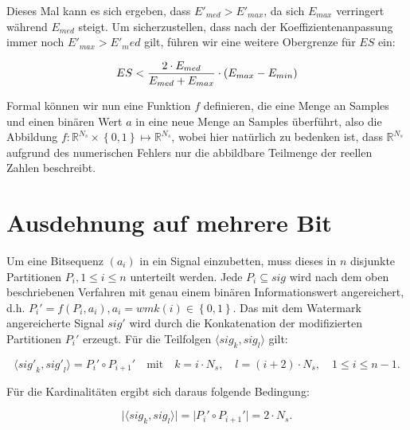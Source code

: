 Dieses Mal kann es sich ergeben, dass ${E'}_{med} > {E'}_{max}$, da sich ${E}_{max}$ verringert während ${E}_{med}$ steigt. Um sicherzustellen, dass nach der Koeffizientenanpassung immer noch ${E'}_{max} > {E'}_med$ gilt, führen wir eine weitere Obergrenze für $ES$ ein:

	\begin{equation}
		ES < { 2 \cdot {E}_{med} \over {E}_{med} + {E}_{max} } \cdot ( {E}_{max} - {E}_{min} )
		\label{equ:embeddingstrengthconstraint_case2}
	\end{equation}

Formal können wir nun eine Funktion $f$ definieren, die eine Menge an Samples und einen binären Wert $a$ in eine neue Menge an Samples überführt, also die Abbildung $f: {\mathbb{R}}^{{N}_{s}} \times \left\{0,1\right\} \mapsto  {\mathbb{R}}^{{N}_{s}}$, wobei hier natürlich zu bedenken ist, dass ${\mathbb{R}}^{{N}_{s}}$ aufgrund des numerischen Fehlers nur die abbildbare Teilmenge der reellen Zahlen beschreibt. 

\section{Ausdehnung auf mehrere Bit}
\label{sec:embeddingstragety_bitsequence}

Um eine Bitsequenz $({a}_{i})$ in ein Signal einzubetten, muss dieses in $n$ disjunkte Partitionen ${P}_{i}, {1}\leq{i}\leq{n}$ unterteilt werden. Jede ${P}_{i}\subseteq{sig}$ wird nach dem oben beschriebenen Verfahren mit genau einem binären Informationswert angereichert, d.h. ${P}_{i}'=f({P}_{i}, {a}_{i}), {a}_{i} = wmk(i)\in\left\{0,1\right\}$. Das mit dem Watermark angereicherte Signal $sig'$ wird durch die Konkatenation der modifizierten Partitionen ${P}_{i}'$ erzeugt. Für die Teilfolgen $\langle{sig}_{k},{sig}_{l}\rangle$ gilt:

	\begin{equation}
		\langle{sig'}_{k},{sig'}_{l}\rangle = {P}_{i}'\circ{P}_{i+1}' \quad\mbox{mit}\quad k=i \cdot {N}_{s},\quad l=(i+2) \cdot {N}_{s},\quad {1}\leq{i}\leq{n-1}.
		\label{equ:signalconcat}
	\end{equation}

Für die Kardinalitäten ergibt sich daraus folgende Bedingung:

	\begin{equation}
 	   \vert\langle{sig}_{k},{sig}_{l}\rangle\vert = \vert{P}_{i}'\circ{P}_{i+1}'\vert = 2 \cdot {N}_{s}.
	   \label{equ:signalcardinality}
	\end{equation}

